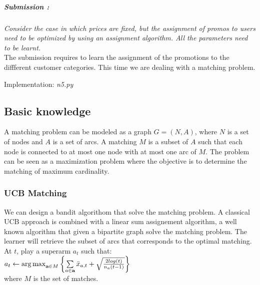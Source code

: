 \subparagraph*{Submission : }
\textit{Consider the case in which prices are fixed, but the assignment of promos to users need to be optimized by using an assignment algorithm. All the parameters need to be learnt.}\\

The submission requires to learn the assignment of the promotions to the diffferent customer categories. This time we are dealing with a matching problem. 

Implementation: \textit{n5.py}
\subsection*{Basic knowledge}
A matching problem can be modeled as a graph $G=(N,A)$, where $N$ is a set of nodes and $A$ is a set of arcs. A matching $M$ is a subset of $A$ such that each node is connected to at most one node with at most one arc of $M$. The problem can be seen as a maximization problem where the objective is to determine the matching of maximum cardinality.\\

\subsubsection*{UCB Matching}
We can design a bandit algorithom that solve the matching problem. A classical UCB approach is combined with a linear sum assignement algorithm, a well known algorithm that given a bipartite graph solve the matching problem. The learner will retrieve the subset of arcs that corresponds to the optimal matching. 
At $t$, play a superarm $a_{t}$ such that:\\
$a_{t} \leftarrow \operatorname{arg\,max}\limits_{\textbf{a} \in M}{\left\{\sum\limits_{a \in \textbf{a}}\bar{x}_{a,t} + \sqrt{\frac{2 log(t)}{{n_{a}(t-1)}} }\right\}}$ \\
where $M$ is the set of matches.


